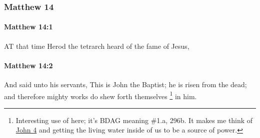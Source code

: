 	\subsubsection{Matthew 14} %
		\label{MATTHEW-14}
		
		\paragraph{Matthew 14:1} %
			\label{MATTHEW-14-1}

			AT that time Herod the tetrarch heard of the fame of Jesus,

			\begin{framed}
			\scriptsize
				\begin{compactdesc}
					\item[SBLG] 
				\end{compactdesc}
			\end{framed}

		\paragraph{Matthew 14:2} %
			\label{MATTHEW-14-2}

			And said unto his servants, This is John the Baptist; he is risen from the dead; and therefore mighty works do shew forth themselves%
				\footnote{%
					Interesting use of  here; it's BDAG meaning \#1.a, 296b. It makes me think of \hyperref[JOHN-4]{John 4} and getting the living water inside of us to be a source of power. 
					}
			in him.

